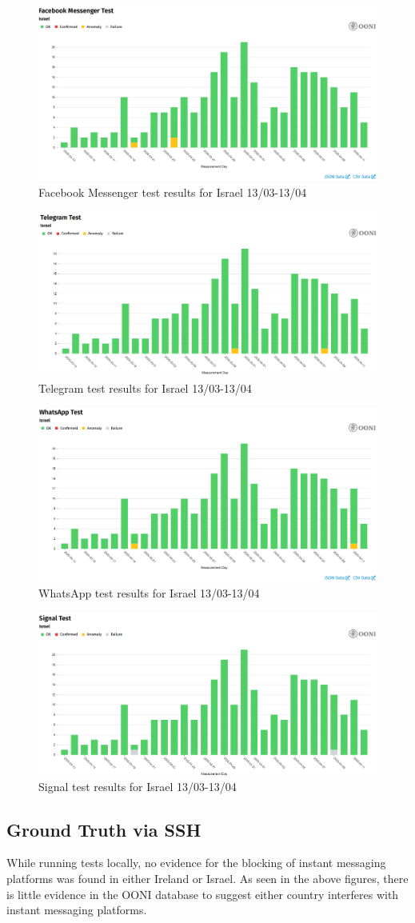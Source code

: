 \begin{figure} [H]
    \centering
    \includegraphics[width=0.5\linewidth]{ISROONIDBFB.png}
    \caption{Facebook Messenger test results for Israel 13/03-13/04}
    \label{fig:enter-label}
\end{figure}
\begin{figure} [H]
    \centering
    \includegraphics[width=0.5\linewidth]{ISROONIDBIM.png}
    \caption{Telegram test results for Israel 13/03-13/04}
    \label{fig:enter-label}
\end{figure}
\begin{figure} [H]
    \centering
    \includegraphics[width=0.5\linewidth]{ISROONIDBTEL.png}
    \caption{WhatsApp test results for Israel 13/03-13/04}
    \label{fig:enter-label}
\end{figure}
\begin{figure} [H]
    \centering
    \includegraphics[width=0.5\linewidth]{ISROONIDBSIG.png}
    \caption{Signal test results for Israel 13/03-13/04}
    \label{fig:enter-label}
\end{figure}


\subsection{Ground Truth via SSH}
While running tests locally, no evidence for the blocking of instant messaging platforms was found in either Ireland or Israel. As seen in the above figures, there is little evidence in the OONI database to suggest either country interferes with instant messaging platforms. 


